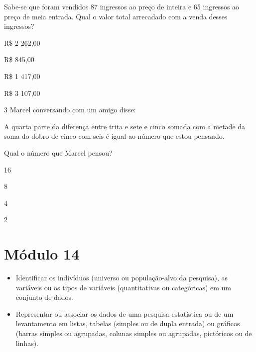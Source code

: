 {Sabe-se que foram vendidos 87 ingressos ao preço de inteira e 65
ingressos ao preço de meia entrada. Qual o valor total arrecadado com a
venda desses ingressos?

\begin{escolha}
\item
  R\$ 2 262,00
\item
  R\$ 845,00
\item
  R\$ 1 417,00
\item
  R\$ 3 107,00
\end{escolha}



\num{3} Marcel conversando com um amigo disse:

A quarta parte da diferença entre trita e sete e cinco somada com a
metade da soma do dobro de cinco com seis é igual ao número que estou
pensando.


Qual o número que Marcel pensou?

\begin{escolha}
\item
  16
\item
  8
\item
  4
\item
  2
\end{escolha}



\chapter{Módulo 14}


\begin{itemize}
\item Identificar os indivíduos (universo ou população-alvo da pesquisa), as
variáveis ou os tipos de variáveis (quantitativas ou categóricas) em um
conjunto de dados.

\item Representar ou associar os dados de uma pesquisa estatística ou de um
levantamento em listas, tabelas (simples ou de dupla entrada) ou
gráficos (barras simples ou agrupadas, colunas simples ou agrupadas,
pictóricos ou de linhas).
\end{itemize}

}
